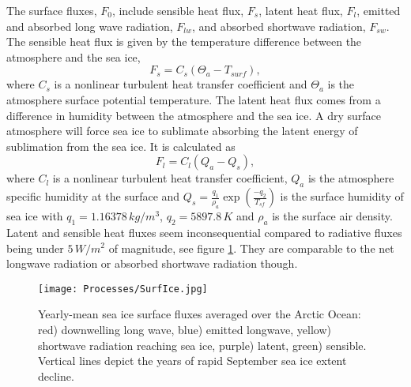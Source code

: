 The surface fluxes, $F_0$, include sensible heat flux, $F_s$, latent heat flux, $F_l$, emitted and absorbed long wave radiation, $F_{lw}$, and absorbed shortwave radiation, $F_{sw}$. The sensible heat flux is given by the temperature difference between the atmosphere and the sea ice,
\begin{equation}
F_s = C_s(\Theta_a-T_{surf}),
\end{equation}
where $C_s$ is a nonlinear turbulent heat transfer coefficient and $\Theta_a$ is the atmosphere surface potential temperature. The latent heat flux comes from a difference in humidity between the atmosphere and the sea ice. A dry surface atmosphere will force sea ice to sublimate absorbing the latent energy of sublimation from the sea ice. It is calculated as 
\begin{equation}
F_l = C_l (Q_a- Q_s),
\end{equation}
where $C_l $ is a nonlinear turbulent heat transfer coefficient, $Q_a$ is the atmosphere specific humidity at the surface and $Q_s=\frac{q_1}{\rho_a}\exp(\frac{-q_2}{T_{sf}})$ is the surface humidity of sea ice with $q_1=1.16378\,kg/m^3$, $q_2 = 5897.8\,K$ and $\rho_a$ is the surface air density. Latent and sensible heat fluxes seem inconsequential compared to radiative fluxes being under $5\,W/m^2$ of magnitude, see figure \ref{Sice}. They are comparable to the net longwave radiation or absorbed shortwave radiation though. 
\begin{figure}[t!]
\center
\noindent\texttt{[image: Processes/SurfIce.jpg]}
\caption{Yearly-mean sea ice surface fluxes averaged over the Arctic Ocean: red) downwelling long wave, blue) emitted longwave, yellow) shortwave radiation reaching sea ice, purple) latent, green) sensible. Vertical lines depict the years of rapid September sea ice extent decline.}
\label{Sice}
\end{figure}

